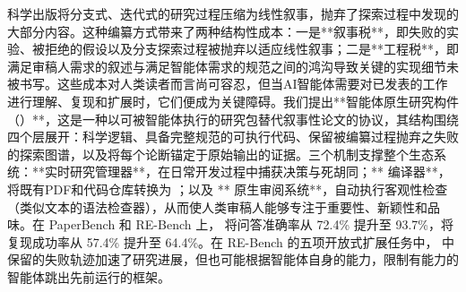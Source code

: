 \begin{markdown}
科学出版将分支式、迭代式的研究过程压缩为线性叙事，抛弃了探索过程中发现的大部分内容。这种编纂方式带来了两种结构性成本：一是**叙事税**，即失败的实验、被拒绝的假设以及分支探索过程被抛弃以适应线性叙事；二是**工程税**，即满足审稿人需求的叙述与满足智能体需求的规范之间的鸿沟导致关键的实现细节未被书写。这些成本对人类读者而言尚可容忍，但当AI智能体需要对已发表的工作进行理解、复现和扩展时，它们便成为关键障碍。我们提出**智能体原生研究构件（\ara{}）**，这是一种以可被智能体执行的研究包替代叙事性论文的协议，其结构围绕四个层展开：科学逻辑、具备完整规范的可执行代码、保留被编纂过程抛弃之失败的探索图谱，以及将每个论断锚定于原始输出的证据。三个机制支撑整个生态系统：**实时研究管理器**，在日常开发过程中捕获决策与死胡同；**\ara{} 编译器**，将既有PDF和代码仓库转换为 \ara{}；以及 **\ara{} 原生审阅系统**，自动执行客观性检查（类似文本的语法检查器），从而使人类审稿人能够专注于重要性、新颖性和品味。在 PaperBench 和 RE-Bench 上，\ara{} 将问答准确率从 72.4\% 提升至 93.7\%，将复现成功率从 57.4\% 提升至 64.4\%。在 RE-Bench 的五项开放式扩展任务中，\ara{} 中保留的失败轨迹加速了研究进展，但也可能根据智能体自身的能力，限制有能力的智能体跳出先前运行的框架。
\end{markdown}
